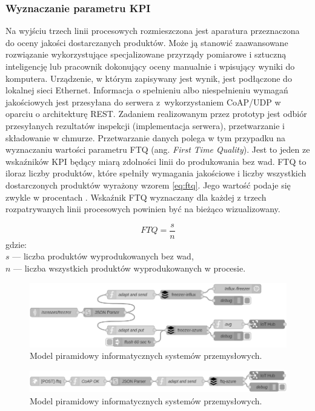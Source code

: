 \documentclass[a4paper, 12pt, twoside]{article}
\begin{document}
\subsubsection{Wyznaczanie parametru KPI}

Na wyjściu trzech linii procesowych rozmieszczona jest aparatura przeznaczona
do oceny jakości dostarczanych produktów. Może ją stanowić zaawansowane
rozwiązanie wykorzystujące specjalizowane przyrządy pomiarowe i sztuczną inteligencję lub
pracownik dokonujący oceny manualnie i wpisujący wyniki do komputera. Urządzenie,
w którym zapisywany jest wynik, jest podłączone do lokalnej sieci Ethernet.
Informacja o spełnieniu albo niespełnieniu wymagań jakościowych jest przesyłana
do serwera z~wykorzystaniem CoAP/UDP w oparciu o architekturę REST. Zadaniem
realizowanym przez prototyp jest odbiór przesyłanych rezultatów inspekcji
(implementacja serwera), przetwarzanie i składowanie w chmurze. Przetwarzanie
danych polega w tym przypadku na wyznaczaniu wartości parametru FTQ
(ang. \emph{First Time Quality}). Jest to jeden ze wskaźników KPI będący miarą
zdolności linii do produkowania bez wad. FTQ to iloraz liczby produktów,
które spełniły wymagania jakościowe i liczby wszystkich dostarczonych produktów
wyrażony wzorem \eqref{eq:ftq}.
Jego wartość podaje się zwykle w procentach \cite{isp}. Wskaźnik FTQ
wyznaczany dla każdej z trzech rozpatrywanych linii procesowych powinien być na bieżąco wizualizowany.

\begin{equation}
      FTQ = \frac{s}{n}\label{eq:ftq}
\end{equation}
\noindent gdzie: \\
$s$ --- liczba produktów wyprodukowanych bez wad,\\
$n$ --- liczba wszystkich produktów wyprodukowanych w procesie.

\begin{figure}[h]
      \centering
      \includegraphics[width=\textwidth]{flow1.png}
      \caption{Model piramidowy informatycznych systemów przemysłowych.}
      \label{fig:flow1}
\end{figure}

\begin{figure}[h]
      \centering
      \includegraphics[width=\textwidth]{flow2.png}
      \caption{Model piramidowy informatycznych systemów przemysłowych.}
      \label{fig:flow2}
\end{figure}
\end{document}
